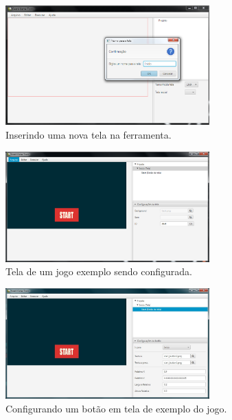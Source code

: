 \documentclass[12pt,twoside,openright,a4paper,english,brazil,sumario=tradicional]{abntex2}
\begin{document}
\begin{anexosenv}
   \begin{figure}[h]
   \centering
   \includegraphics[width=0.7\textwidth]{images/add_tela.png}
   \caption{Inserindo uma nova tela na ferramenta.}
   \label{fig:add_tela}
   \end{figure}

   \begin{figure}[h]
   \centering
   \includegraphics[width=0.7\textwidth]{images/add_tela_2.png}
   \caption{Tela de um jogo exemplo sendo configurada.}
   \label{fig:add_tela_2}
   \end{figure}

   \begin{figure}[h]
   \centering
   \includegraphics[width=0.7\textwidth]{images/add_botao.jpg}
   \caption{Configurando um botão em tela de exemplo do jogo.}
   \label{fig:add_botao}
   \end{figure}


\end{anexosenv}
\end{document}
